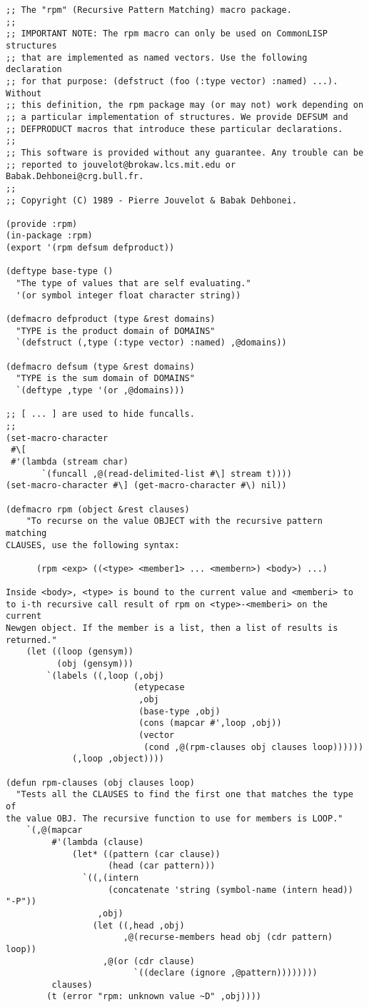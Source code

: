 \documentclass[a4paper,11pt]{article}
\begin{document}
\begin{verbatim}
;; The "rpm" (Recursive Pattern Matching) macro package.
;;
;; IMPORTANT NOTE: The rpm macro can only be used on CommonLISP structures
;; that are implemented as named vectors. Use the following declaration
;; for that purpose: (defstruct (foo (:type vector) :named) ...). Without
;; this definition, the rpm package may (or may not) work depending on
;; a particular implementation of structures. We provide DEFSUM and
;; DEFPRODUCT macros that introduce these particular declarations.
;; 
;; This software is provided without any guarantee. Any trouble can be
;; reported to jouvelot@brokaw.lcs.mit.edu or Babak.Dehbonei@crg.bull.fr.
;;
;; Copyright (C) 1989 - Pierre Jouvelot & Babak Dehbonei.

(provide :rpm)
(in-package :rpm)
(export '(rpm defsum defproduct))

(deftype base-type ()
  "The type of values that are self evaluating."
  '(or symbol integer float character string))

(defmacro defproduct (type &rest domains)
  "TYPE is the product domain of DOMAINS"
  `(defstruct (,type (:type vector) :named) ,@domains))

(defmacro defsum (type &rest domains)
  "TYPE is the sum domain of DOMAINS"
  `(deftype ,type '(or ,@domains)))

;; [ ... ] are used to hide funcalls.
;;
(set-macro-character
 #\[
 #'(lambda (stream char)
       `(funcall ,@(read-delimited-list #\] stream t))))
(set-macro-character #\] (get-macro-character #\) nil))

(defmacro rpm (object &rest clauses)
    "To recurse on the value OBJECT with the recursive pattern matching
CLAUSES, use the following syntax:

      (rpm <exp> ((<type> <member1> ... <membern>) <body>) ...)

Inside <body>, <type> is bound to the current value and <memberi> to
to i-th recursive call result of rpm on <type>-<memberi> on the current
Newgen object. If the member is a list, then a list of results is
returned."
    (let ((loop (gensym))
          (obj (gensym)))
        `(labels ((,loop (,obj)
                         (etypecase
                          ,obj
                          (base-type ,obj)
                          (cons (mapcar #',loop ,obj))
                          (vector
                           (cond ,@(rpm-clauses obj clauses loop))))))
             (,loop ,object))))

(defun rpm-clauses (obj clauses loop)
  "Tests all the CLAUSES to find the first one that matches the type of
the value OBJ. The recursive function to use for members is LOOP."
    `(,@(mapcar 
         #'(lambda (clause)
             (let* ((pattern (car clause))
                    (head (car pattern)))
               `((,(intern 
                    (concatenate 'string (symbol-name (intern head)) "-P"))
                  ,obj)
                 (let ((,head ,obj)
                       ,@(recurse-members head obj (cdr pattern) loop))
                   ,@(or (cdr clause)
                         `((declare (ignore ,@pattern))))))))
         clauses)
        (t (error "rpm: unknown value ~D" ,obj))))


\end{verbatim}
\end{document}
